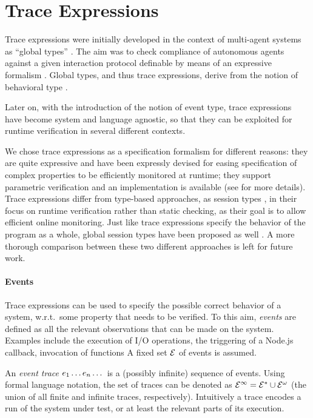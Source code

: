 \section{Trace Expressions}
\label{sec:trace}
Trace expressions were initially developed in the context of multi-agent systems as ``global types'' \cite{AnconaDM12}.
The aim was to check compliance of autonomous agents against a given interaction protocol definable by means of an expressive
formalism \cite{AnconaBFMT14, BriolaMA14}.
Global types, and thus trace expressions, derive from the notion of behavioral type \cite{AnconaBB0CDGGGH16}.

Later on, with the introduction of the notion of event type, trace expressions have become system and language agnostic, so that they can be exploited for runtime verification in several different contexts.


We chose trace expressions as a specification formalism for different reasons: they are quite expressive \cite{ancona2016comparing} and have been expressly devised for easing specification of complex properties to be efficiently monitored at runtime; they support parametric verification \cite{AnconaFM17} and an implementation is available (see \cite{TowardsIoT17} for more details).
Trace expressions differ from type-based approaches, as session types \cite{sessiontypes}, in their focus on runtime verification rather than static checking, as their goal is to allow efficient online monitoring.
Just like trace expressions specify the behavior of the program as a whole, global session types have been proposed as well \cite{globalst,Vasconcelos11}.
A more thorough comparison between these two different approaches is left for future work.

\paragraph{Events}
Trace expressions can be used to specify the possible correct behavior of a system, w.r.t.\ some property that needs to be verified.
To this aim, \emph{events} are defined as all the relevant observations that can be made on the system.
Examples include the execution of I/O operations, the triggering of a Node.js callback, invocation of functions\textellipsis{} A fixed set \(\mathcal{E}\) of events is assumed.

An \emph{event trace} \(e_1\dots e_n\dots\) is a (possibly infinite) sequence of events.
Using formal language notation, the set of traces can be denoted as \(\mathcal{E}^\infty = \mathcal{E}^* \cup \mathcal{E}^\omega\) (the union of all finite and infinite traces, respectively).
Intuitively a trace encodes a run of the system under test, or at least the relevant parts of its execution.

